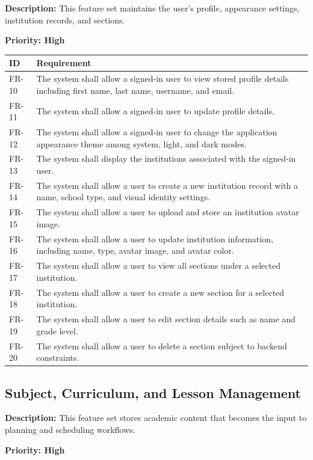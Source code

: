 \documentclass[12pt]{article}
\begin{document}
\textbf{Description:} This feature set maintains the user's profile, appearance
settings, institution records, and sections.

\textbf{Priority: High}

\begin{longtable}{|L{2.3cm}|L{11.3cm}|}
\hline
\textbf{ID} & \textbf{Requirement} \\
\hline
FR-10 & The system shall allow a signed-in user to view stored profile details including first name, last name, username, and email. \\
\hline
FR-11 & The system shall allow a signed-in user to update profile details. \\
\hline
FR-12 & The system shall allow a signed-in user to change the application appearance theme among system, light, and dark modes. \\
\hline
FR-13 & The system shall display the institutions associated with the signed-in user. \\
\hline
FR-14 & The system shall allow a user to create a new institution record with a name, school type, and visual identity settings. \\
\hline
FR-15 & The system shall allow a user to upload and store an institution avatar image. \\
\hline
FR-16 & The system shall allow a user to update institution information, including name, type, avatar image, and avatar color. \\
\hline
FR-17 & The system shall allow a user to view all sections under a selected institution. \\
\hline
FR-18 & The system shall allow a user to create a new section for a selected institution. \\
\hline
FR-19 & The system shall allow a user to edit section details such as name and grade level. \\
\hline
FR-20 & The system shall allow a user to delete a section subject to backend constraints. \\
\hline
\end{longtable}

\subsection{Subject, Curriculum, and Lesson Management}

\textbf{Description:} This feature set stores academic content that becomes the
input to planning and scheduling workflows.

\textbf{Priority: High}
\end{document}
